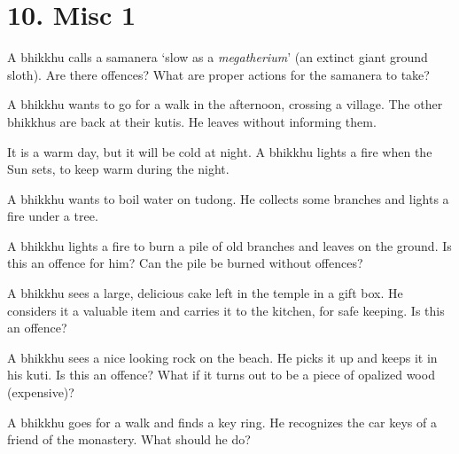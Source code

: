 \chapter{10. Misc 1}
\renewcommand*{\theChapterTitle}{10. Misc 1}

A bhikkhu calls a samanera `slow as a \emph{megatherium}' (an extinct giant ground sloth).
Are there offences?
What are proper actions for the samanera to take?

\bigskip

A bhikkhu wants to go for a walk in the afternoon, crossing a village. The other bhikkhus are back at their kutis.
He leaves without informing them.

\bigskip

It is a warm day, but it will be cold at night. A bhikkhu lights a fire when the Sun sets, to keep warm during the night.

\bigskip

A bhikkhu wants to boil water on tudong. He collects some branches and lights a fire under a tree.

\bigskip

A bhikkhu lights a fire to burn a pile of old branches and leaves on the ground.
Is this an offence for him?
Can the pile be burned without offences?

\bigskip

A bhikkhu sees a large, delicious cake left in the temple in a gift box.
He considers it a valuable item and carries it to the kitchen, for safe keeping.
Is this an offence?

\bigskip

A bhikkhu sees a nice looking rock on the beach.
He picks it up and keeps it in his kuti.
Is this an offence?
What if it turns out to be a piece of opalized wood (expensive)?

\bigskip

A bhikkhu goes for a walk and finds a key ring.
He recognizes the car keys of a friend of the monastery.
What should he do?

